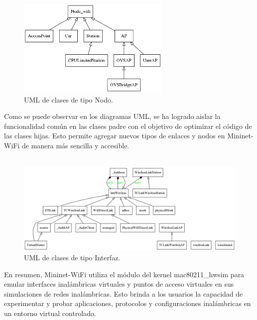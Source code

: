 \begin{figure}[ht]
    \centering
    \includegraphics[width=0.65\textwidth]{archivos/img/dev/p4-wifi/analysis/uml_node.png}
    \caption{UML de clases de tipo Nodo.}
    \label{fig:analysis_p4_wifi_4}
\end{figure}



Como se puede observar en los diagramas UML, se ha logrado aislar la funcionalidad común en las clases padre con el objetivo de optimizar el código de las clases hijas. Esto permite agregar nuevos tipos de enlaces y nodos en Mininet-WiFi de manera más sencilla y accesible.\\
\\

\begin{figure}[ht]
    \centering
    \includegraphics[width=\textwidth]{archivos/img/dev/p4-wifi/analysis/uml_link.png}
    \caption{UML de clases de tipo Interfaz.}
    \label{fig:analysis_p4_wifi_5}
\end{figure}


En resumen, Mininet-WiFi utiliza el módulo del kernel mac80211\_hwsim para emular interfaces inalámbricas virtuales y puntos de acceso virtuales en sus simulaciones de redes inalámbricas. Esto brinda a los usuarios la capacidad de experimentar y probar aplicaciones, protocolos y configuraciones inalámbricas en un entorno virtual controlado.


